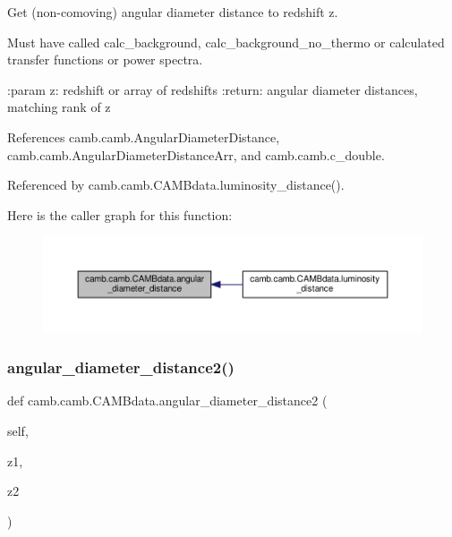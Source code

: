 \begin{DoxyVerb}Get (non-comoving) angular diameter distance to redshift z.

Must have called calc_background, calc_background_no_thermo or calculated transfer functions or power spectra.

:param z: redshift or array of redshifts
:return: angular diameter distances, matching rank of z
\end{DoxyVerb}
 

References camb.\+camb.\+Angular\+Diameter\+Distance, camb.\+camb.\+Angular\+Diameter\+Distance\+Arr, and camb.\+camb.\+c\+\_\+double.



Referenced by camb.\+camb.\+C\+A\+M\+Bdata.\+luminosity\+\_\+distance().

Here is the caller graph for this function\+:
\nopagebreak
\begin{figure}[H]
\begin{center}
\leavevmode
\includegraphics[width=350pt]{classcamb_1_1camb_1_1CAMBdata_abbd4962602adc08e9ebecc753ac6f03d_icgraph}
\end{center}
\end{figure}
\mbox{\label{classcamb_1_1camb_1_1CAMBdata_ae4db43918bfea949a2ab44a2939e380d}} 
\subsubsection{\texorpdfstring{angular\+\_\+diameter\+\_\+distance2()}{angular\_diameter\_distance2()}}
{\footnotesize\ttfamily def camb.\+camb.\+C\+A\+M\+Bdata.\+angular\+\_\+diameter\+\_\+distance2 (\begin{DoxyParamCaption}\item[{}]{self,  }\item[{}]{z1,  }\item[{}]{z2 }\end{DoxyParamCaption})}

